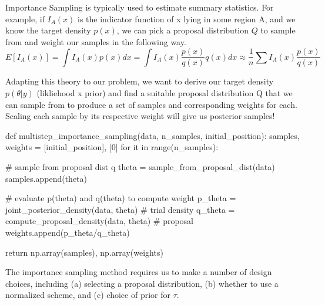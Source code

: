 \documentclass[12pt,letterpaper,twoside]{article}
\begin{document}
Importance Sampling is typically used to estimate summary statistics. 
For example, if $I_A(x)$ is the indicator function of x lying in 
some region A, and we know the target density $p(x)$, we can pick a 
proposal distribution $Q$ to sample from and weight our samples 
in the following way.
$$ E[I_A(x)] = \int I_A(x) p(x) dx = \int I_A(x) \frac{p(x)}{q(x)} q(x) dx \approx \frac{1}{n} \sum I_A(x) \frac{p(x)}{q(x)} $$ 

Adapting this theory to our problem, we want to derive our target 
density $p(\theta|y)$ (likliehood x prior) and find a suitable 
proposal distribution Q that we can sample from to produce a set 
of samples and corresponding weights for each. Scaling each sample 
by its respective weight will give us posterior samples! \newline

\begin{python}
    def multistep_importance_sampling(data, n_samples, initial_position):
    samples, weights = [initial_position], [0]
    for it in range(n_samples):

        # sample from proposal dist q
        theta = sample_from_proposal_dist(data)
        samples.append(theta)

        # evaluate p(theta) and q(theta) to compute weight
        p_theta = joint_posterior_density(data, theta)  # trial density
        q_theta = compute_proposal_density(data, theta)  # proposal
        weights.append(p_theta/q_theta)

    return np.array(samples), np.array(weights)
\end{python}

The importance sampling method requires us to make a number of design 
choices, including (a) selecting a proposal distribution, (b) whether to 
use a normalized scheme, and (c) choice of prior for $\tau$.
\end{document}

